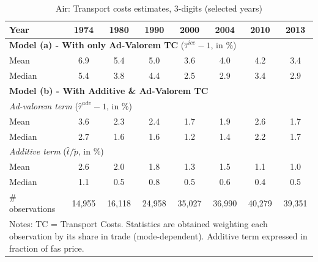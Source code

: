\documentclass[a4paper,11pt]{article}
\begin{document}
\begin{table}[htbp]
  \caption{Air: Transport costs estimates, 3-digits (selected years)}
\begin{center}
    \begin{tabular}{l|ccccccc}
\hline\hline
Year & 1974  & 1980  & 1990  & 2000  & 2004 & 2010  & 2013   \\
\hline
\multicolumn{8}{l}{\textbf{Model (a) - With only Ad-Valorem TC} ($\widehat{\tau}^{ice}-1$, in \%)}     \\
\hline
Mean  & 6.9& 5.4 &5.0 & 3.6 & 4.0 & 4.2 & 3.4  \\
Median & 5.4 & 3.8 & 4.4 & 2.5 & 2.9 & 3.4 & 2.9  \\
\hline
\multicolumn{8}{l}{\textbf{Model (b) - With Additive \& Ad-Valorem TC}}    \\
\hline
\multicolumn{8}{l}{\textit{Ad-valorem term} ($\widehat{\tau}^{adv}-1$, in \%)}  \\ \hline
Mean & 3.6 & 2.3 & 2.4 &1.7 & 1.9 & 2.6 & 1.7  \\
Median & 2.7 & 1.6 & 1.6 & 1.2 & 1.4 & 2.2 & 1.7 \\

\hline
\multicolumn{8}{l}{\textit{Additive term} ($\widehat{t}/\widetilde{p}$, in \%)}     \\ \hline
Mean & 2.6 & 2.0 & 1.8 & 1.3 & 1.5 & 1.1 & 1.0  \\
Median & 1.1 & 0.5 & 0.8 & 0.5 & 0.6 & 0.4 & 0.5  \\
\hline
\# observations & 14,955 & 16,118 & 24,958 & 35,027 & 36,990 & 40,279 & 39,351  \\
\hline\hline
\multicolumn{8}{l}{\parbox[l]{11cm}{ \vspace{7pt}\scriptsize{Notes: TC = Transport Costs.
Statistics are obtained weighting each observation by its share in trade (mode-dependent).
Additive term expressed in fraction of fas price.}}}
\end{tabular}%
\end{center}
\label{tab:result_air_3d_detail}
\end{table}%
\end{document}
